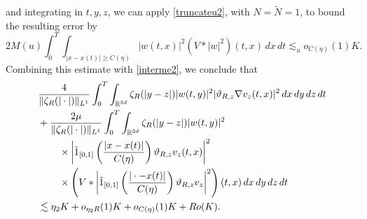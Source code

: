 \documentclass[reqno,11pt]{amsart}
\theoremstyle{plain}
\theoremstyle{definition}
\numberwithin{equation}{section}
\numberwithin{theorem}{section}
\def\geq{\geqslant}
\def\R{\mathbb{R}}
\begin{document}
and integrating in $t,y,z$, we can apply \eqref{truncateu2}, with
$N=\tilde N=1$, to bound the resulting error by
\[
 2M(u)\int_0^T\int_{|x-x(t)|\geq C(\eta)}
 |w(t,x)|^2(V*|w|^2)(t,x)\,dx\,dt
 \lesssim_u o_{C(\eta)}(1)K.
\]
Combining this estimate with \eqref{interme2}, we conclude that
\begin{align}\label{finalz1}
 &\frac4{\|\zeta_R(|\cdot|)\|_{L^1}}
 \int_0^T\int_{\R^{3d}}\zeta_R(|y-z|)|w(t,y)|^2
 |\vartheta_{R,z}\nabla v_z(t,x)|^2\,dx\,dy\,dz\,dt\notag\\
 &+\frac{2\mu}{\|\zeta_R(|\cdot|)\|_{L^1}}
 \int_0^T\int_{\R^{3d}}\zeta_R(|y-z|)|w(t,y)|^2\notag\\
 &\hspace{5ex}\times\left|\tilde{1}_{[0,1]}\left(\frac{|x-x(t)|}{C(\eta)}\right)
                 \vartheta_{R,z}v_z(t,x)\right|^2\notag\\
 &\hspace{5ex}\times\left(V*\left|\tilde{1}_{[0,1]}
                 \left(\frac{|\cdot-x(t)|}{C(\eta)}\right)
                 \vartheta_{R,z}v_z\right|^2\right)(t,x)\,dx\,dy\,dz\,dt\notag\\
 &\lesssim\eta_2K+o_{\eta_2R}(1)K+o_{C(\eta)}(1)K+Ro(K).
\end{align}
\end{document}
